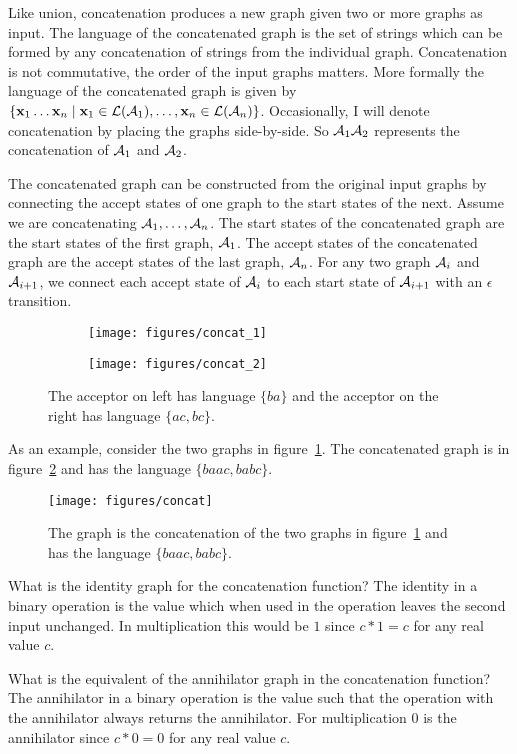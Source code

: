 Like union, concatenation produces a new graph given two or more graphs as
input. The language of the concatenated graph is the set of strings which can
be formed by any concatenation of strings from the individual graph.
Concatenation is not commutative, the order of the input graphs matters. More
formally the language of the concatenated graph is given by $\{{\bf x}_1 \ldots
{\bf x}_n \mid {\bf x}_1 \in \mathcal{L}(\mathcal{A}_1), \ldots, {\bf x}_n \in \mathcal{L}(\mathcal{A}_n)\}$. Occasionally, I
will denote concatenation by placing the graphs side-by-side. So $\mathcal{A}_1 \mathcal{A}_2$
represents the concatenation of $\mathcal{A}_1$ and $\mathcal{A}_2$.

The concatenated graph can be constructed from the original input graphs by
connecting the accept states of one graph to the start states of the next.
Assume we are concatenating $\mathcal{A}_1, \ldots, \mathcal{A}_n$. The start states of the
concatenated graph are the start states of the first graph, $\mathcal{A}_1$. The accept
states of the concatenated graph are the accept states of the last graph,
$\mathcal{A}_n$. For any two graph $\mathcal{A}_i$ and $\mathcal{A}_{i+1}$, we connect each accept
state of $\mathcal{A}_i$ to each start state of $\mathcal{A}_{i+1}$ with an $\epsilon$
transition.

\begin{figure}
    \centering
    \begin{subfigure}[b]{0.48\textwidth}
        \centering
        \texttt{[image: figures/concat\_1]}
    \end{subfigure}
    \begin{subfigure}[b]{0.48\textwidth}
        \centering
        \texttt{[image: figures/concat\_2]}
    \end{subfigure}
    \caption{The acceptor on left has language $\{ba\}$ and the acceptor on the
    right has language $\{ac, bc\}$.}
    \label{fig:concat_inputs}
\end{figure}

As an example, consider the two graphs in figure~\ref{fig:concat_inputs}. The
concatenated graph is in figure~\ref{fig:concat} and has the language $\{baac,
babc\}$.

\begin{figure}
    \centering
    \texttt{[image: figures/concat]}
    \caption{The graph is the concatenation of the two graphs in
    figure~\ref{fig:concat_inputs} and has the language $\{baac, babc\}$.}
    \label{fig:concat}
\end{figure}

\begin{example}
What is the identity graph for the concatenation function? The identity in a
binary operation is the value which when used in the operation leaves the second
input unchanged. In multiplication this would be $1$ since $c * 1 = c$ for any
real value $c$.

What is the equivalent of the annihilator graph in the concatenation function?
The annihilator in a binary operation is the value such that the operation with
the annihilator always returns the annihilator. For multiplication $0$ is the
annihilator since $c *0 = 0$ for any real value $c$.
\end{example}

